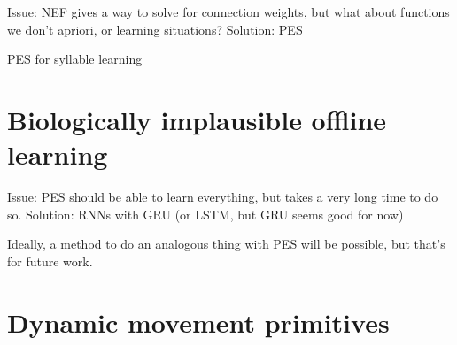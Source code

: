 Issue: NEF gives a way to solve for connection weights,
but what about functions we don't apriori,
or learning situations?
Solution: PES

PES for syllable learning

\section{Biologically implausible offline learning}

Issue: PES should be able to learn everything,
but takes a very long time to do so.
Solution: RNNs with GRU (or LSTM, but GRU seems good for now)

Ideally, a method to do an analogous thing with PES
will be possible, but that's for future work.

\section{Dynamic movement primitives}

